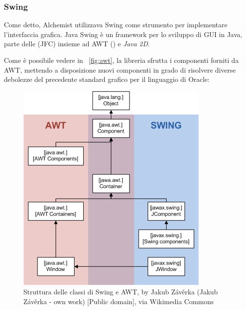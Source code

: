             \subsubsection{Swing}\label{subsub:swing}
                Come detto, Alchemist utilizzava Swing come strumento per implementare l'interfaccia grafica. Java Swing è un framework per lo sviluppo di GUI in Java, parte delle  (JFC) insieme ad AWT () e \emph{Java 2D}.

                Come è possibile vedere in \figurename~\vref{fig:awt}, la libreria sfrutta i componenti forniti da AWT, mettendo a disposizione nuovi componenti in grado di risolvere diverse debolezze del precedente standard grafico per il linguaggio di Oracle:

                \begin{figure}[htbp]\label{fig:awt}
                    \centering
                    \includegraphics[scale=.45]{img/AWTSwing}
                    \caption{Struttura delle classi di Swing e AWT, by Jakub Závěrka (Jakub Závěrka - own work) [Public domain], via Wikimedia Commons}
                \end{figure}

